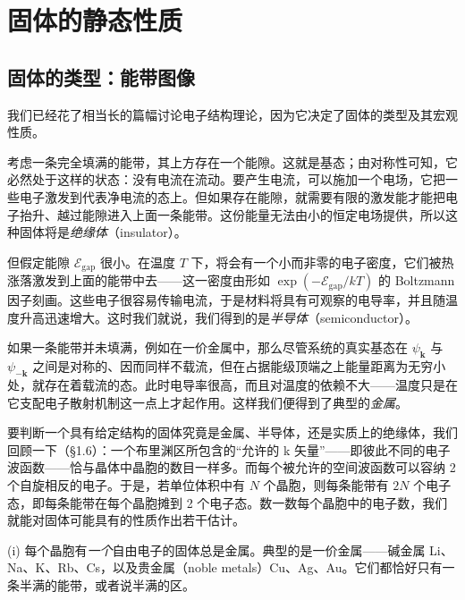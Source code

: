 
\chapter{固体的静态性质}


\section{固体的类型：能带图像}

我们已经花了相当长的篇幅讨论电子结构理论，因为它决定了固体的类型及其宏观性质。

考虑一条完全填满的能带，其上方存在一个能隙。这就是基态；由对称性可知，它必然处于这样的状态：没有电流在流动。要产生电流，可以施加一个电场，它把一些电子激发到代表净电流的态上。但如果存在能隙，就需要有限的激发能才能把电子抬升、越过能隙进入上面一条能带。这份能量无法由小的恒定电场提供，所以这种固体将是\emph{绝缘体}（insulator）。


但假定能隙 $\mathcal{E}_{\mathrm{gap}}$ 很小。在温度 $T$ 下，将会有一个小而非零的电子密度，它们被热涨落激发到上面的能带中去——这一密度由形如 $\exp(-\mathcal{E}_{\mathrm{gap}}/kT)$ 的 Boltzmann 因子刻画。这些电子很容易传输电流，于是材料将具有可观察的电导率，并且随温度升高迅速增大。这时我们就说，我们得到的是\emph{半导体}（semiconductor）。

如果一条能带并未填满，例如在一价金属中，那么尽管系统的真实基态在 $\psi_{\mathbf{k}}$ 与 $\psi_{-\mathbf{k}}$ 之间是对称的、因而同样不载流，但在占据能级顶端之上能量距离为无穷小处，就存在着载流的态。此时电导率很高，而且对温度的依赖不大——温度只是在它支配电子散射机制这一点上才起作用。这样我们便得到了典型的\emph{金属}。

要判断一个具有给定结构的固体究竟是金属、半导体，还是实质上的绝缘体，我们回顾一下（§1.6）：一个布里渊区所包含的“允许的 k 矢量”——即彼此不同的电子波函数——恰与晶体中晶胞的数目一样多。而每个被允许的空间波函数可以容纳 2 个自旋相反的电子。于是，若单位体积中有 $N$ 个晶胞，则每条能带有 $2N$ 个电子态，即每条能带在每个晶胞摊到 2 个电子态。数一数每个晶胞中的电子数，我们就能对固体可能具有的性质作出若干估计。

(i) 每个晶胞有\emph{一个}自由电子的固体总是金属。典型的是一价金属——碱金属 Li、Na、K、Rb、Cs，以及贵金属（noble metals）Cu、Ag、Au。它们都恰好只有一条半满的能带，或者说半满的区。

